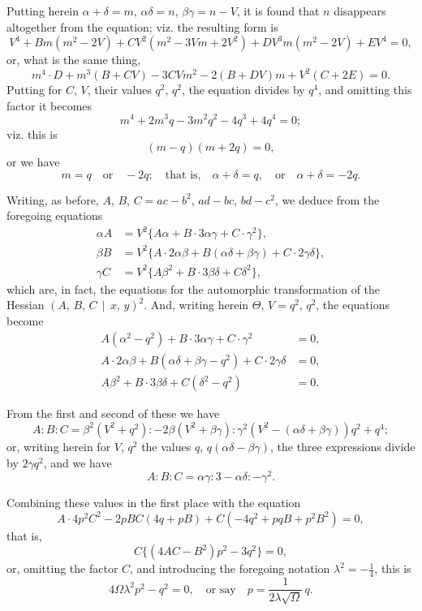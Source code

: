 \documentclass[11pt,a4paper]{article}
\theoremstyle{cayley}
\begin{document}
Putting herein $\alpha + \delta = m$, $\alpha\delta = n$, $\beta\gamma = n - V$, it is found that $n$ disappears altogether from the equation; viz. the resulting form is
\[
V^{4} + Bm(m^{2} - 2V) + C V^{2}(m^{2} - 3Vm + 2V^{2}) + D V^{3}m(m^{2} - 2V) + E V^{4} = 0,
\]
or, what is the same thing,
\[
m^{4} \cdot D + m^{3}(B + CV) - 3CVm^{2} - 2(B + DV)m + V^{2}(C + 2E) = 0.
\]
Putting for $C$, $V$, their values $q^{2}$, $q^{2}$, the equation divides by $q^{4}$, and omitting this factor it becomes
\[
m^{4} + 2m^{3}q - 3m^{2}q^{2} - 4q^{3} + 4q^{4} = 0;
\]
viz. this is
\[
(m - q)(m + 2q) = 0,
\]
or we have
\[
m = q \quad\text{or}\quad -2q;\quad \text{that is,}\quad \alpha + \delta = q,\quad \text{or}\quad \alpha + \delta = -2q.
\]

Writing, as before, $A$, $B$, $C = ac - b^{2}$, $ad - bc$, $bd - c^{2}$, we deduce from the foregoing equations
\begin{align*}
\alpha A &= V^{2}\{A\alpha + B\cdot 3\alpha\gamma + C\cdot \gamma^{2}\},\\
\beta B &= V^{2}\{A\cdot 2\alpha\beta + B(\alpha\delta + \beta\gamma) + C\cdot 2\gamma\delta\},\\
\gamma C &= V^{2}\{A\beta^{2} + B\cdot 3\beta\delta + C\delta^{2}\},
\end{align*}
which are, in fact, the equations for the automorphic transformation of the Hessian $(A,\, B,\, C \,\!\!\mid\!\!\, x,\, y)^{2}$. And, writing herein $\Theta$, $V = q^{2}$, $q^{2}$, the equations become
\begin{align*}
A(\alpha^{2} - q^{2}) + B\cdot 3\alpha\gamma + C\cdot \gamma^{2} &= 0,\\
A\cdot 2\alpha\beta + B(\alpha\delta + \beta\gamma - q^{2}) + C\cdot 2\gamma\delta &= 0,\\
A\beta^{2} + B\cdot 3\beta\delta + C(\delta^{2} - q^{2}) &= 0.
\end{align*}

From the first and second of these we have
\[
A : B : C = \beta^{2}(V^{2} + q^{2}) : -2\beta(V^{2} + \beta\gamma) : \gamma^{2}(V^{2} - (\alpha\delta + \beta\gamma))q^{2} + q^{4};
\]
or, writing herein for $V$, $q^{2}$ the values $q$, $q(\alpha\delta - \beta\gamma)$, the three expressions divide by $2\gamma q^{2}$, and we have
\[
A : B : C = \alpha\gamma : 3 - \alpha\delta : -\gamma^{2}.
\]

Combining these values in the first place with the equation
\[
A\cdot 4p^{2}C^{2} - 2pBC(4q + pB) + C(-4q^{2} + pqB + p^{2}B^{2}) = 0,
\]
that is,
\[
C\{(4AC - B^{2})p^{2} - 3q^{2}\} = 0,
\]
or, omitting the factor $C$, and introducing the foregoing notation $\lambda^{2} = -\frac{1}{4}$, this is
\[
4\Omega\lambda^{2}p^{2} - q^{2} = 0,\quad \text{or say}\quad p = \frac{1}{2\lambda\sqrt{\Omega}}\,q.
\]
\end{document}
